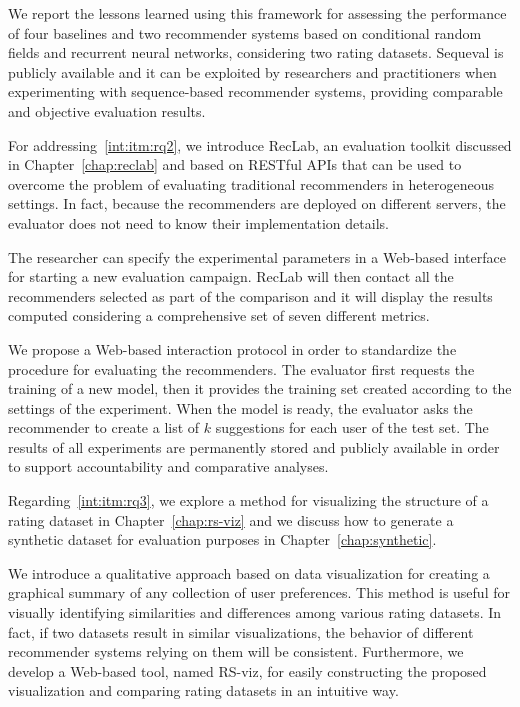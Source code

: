 We report the lessons learned using this framework for assessing the performance of four baselines and two recommender systems based on conditional random fields and recurrent neural networks, considering two rating datasets. Sequeval is publicly available and it can be exploited by researchers and practitioners when experimenting with sequence-based recommender systems, providing comparable and objective evaluation results.

For addressing~\ref{int:itm:rq2}, we introduce RecLab, an evaluation toolkit discussed in Chapter~\ref{chap:reclab} and based on RESTful APIs that can be used to overcome the problem of evaluating traditional recommenders in heterogeneous settings. In fact, because the recommenders are deployed on different servers, the evaluator does not need to know their implementation details.

The researcher can specify the experimental parameters in a Web-based interface for starting a new evaluation campaign. RecLab will then contact all the recommenders selected as part of the comparison and it will display the results computed considering a comprehensive set of seven different metrics.

We propose a Web-based interaction protocol in order to standardize the procedure for evaluating the recommenders. The evaluator first requests the training of a new model, then it provides the training set created according to the settings of the experiment. When the model is ready, the evaluator asks the recommender to create a list of $k$ suggestions for each user of the test set. The results of all experiments are permanently stored and publicly available in order to support accountability and comparative analyses.

Regarding~\ref{int:itm:rq3}, we explore a method for visualizing the structure of a rating dataset in Chapter~\ref{chap:rs-viz} and we discuss how to generate a synthetic dataset for evaluation purposes in Chapter~\ref{chap:synthetic}.

We introduce a qualitative approach based on data visualization for creating a graphical summary of any collection of user preferences. This method is useful for visually identifying similarities and differences among various rating datasets. In fact, if two datasets result in similar visualizations, the behavior of different recommender systems relying on them will be consistent. Furthermore, we develop a Web-based tool, named RS-viz, for easily constructing the proposed visualization and comparing rating datasets in an intuitive way.

